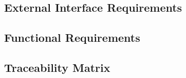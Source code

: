 \documentclass{article}
\begin{document}
	\subsection{External Interface Requirements}
	
	
	\clearpage
	\subsection{Functional Requirements}
	

	\subsection{Traceability Matrix}
		
\end{document}
